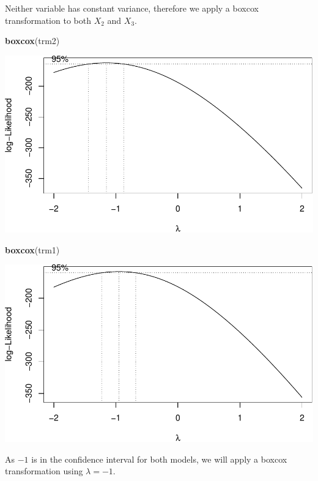 \documentclass[]{article}
\newenvironment{Shaded}{\begin{snugshade}}{\end{snugshade}}
\newcommand{\KeywordTok}[1]{\textcolor[rgb]{0.13,0.29,0.53}{\textbf{#1}}}
\newcommand{\NormalTok}[1]{#1}
\begin{document}
Neither variable has constant variance, therefore we apply a boxcox
transformation to both \(X_{2}\) and \(X_{3}\).

\newpage

\begin{Shaded}
\begin{Highlighting}[]
\KeywordTok{boxcox}\NormalTok{(trm2)}
\end{Highlighting}
\end{Shaded}

\includegraphics{./figures/unnamed-chunk-33-1.pdf}

\begin{Shaded}
\begin{Highlighting}[]
\KeywordTok{boxcox}\NormalTok{(trm1)}
\end{Highlighting}
\end{Shaded}

\includegraphics{./figures/unnamed-chunk-34-1.pdf}

\newpage

As \(-1\) is in the confidence interval for both models, we will apply a
boxcox transformation using \(\lambda = -1\).
\end{document}
